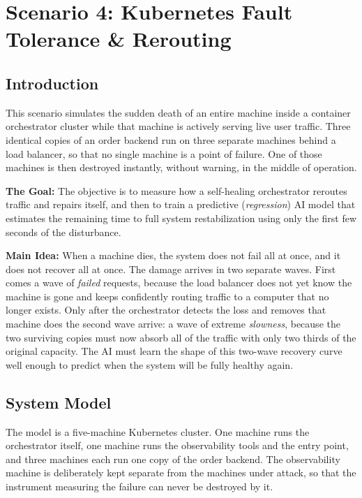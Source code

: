 %
%
%

\section{Scenario 4: Kubernetes Fault Tolerance \& Rerouting}

\subsection{Introduction}
This scenario simulates the sudden death of an entire machine inside a container
orchestrator cluster while that machine is actively serving live user traffic.
Three identical copies of an order backend run on three separate machines behind
a load balancer, so that no single machine is a point of failure. One of those
machines is then destroyed instantly, without warning, in the middle of
operation.

\textbf{The Goal:} The objective is to measure how a self-healing orchestrator
reroutes traffic and repairs itself, and then to train a predictive
(\textit{regression}) AI model that estimates the remaining time to full system
restabilization using only the first few seconds of the disturbance.

\textbf{Main Idea:} When a machine dies, the system does not fail all at once,
and it does not recover all at once. The damage arrives in two separate waves.
First comes a wave of \textit{failed} requests, because the load balancer does
not yet know the machine is gone and keeps confidently routing traffic to a
computer that no longer exists. Only after the orchestrator detects the loss and
removes that machine does the second wave arrive: a wave of extreme
\textit{slowness}, because the two surviving copies must now absorb all of the
traffic with only two thirds of the original capacity. The AI must learn the
shape of this two-wave recovery curve well enough to predict when the system
will be fully healthy again.

\subsection{System Model}
The model is a five-machine Kubernetes cluster. One machine runs the
orchestrator itself, one machine runs the observability tools and the entry
point, and three machines each run one copy of the order backend. The
observability machine is deliberately kept separate from the machines under
attack, so that the instrument measuring the failure can never be destroyed by
it.

